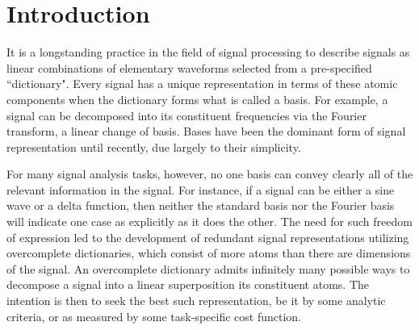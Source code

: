 \chapter{Introduction}\label{Intro}




It is a longstanding practice in the field of signal processing to describe signals as linear combinations of elementary waveforms selected from a pre-specified ``dictionary". Every signal has a unique representation in terms of these atomic components when the dictionary forms what is called a basis. For example, a signal can be decomposed into its constituent frequencies via the Fourier transform, a linear change of basis. %
Bases have been the dominant form of signal representation until recently, due largely to their simplicity. 

For many signal analysis tasks, however, no one basis can convey clearly all of the relevant information in the signal. For instance, if a signal can be either a sine wave or a delta function, then neither the standard basis nor the Fourier basis will indicate one case as explicitly as it does the other. 
The need for such freedom of expression led to the development of redundant signal representations utilizing overcomplete dictionaries, which consist of more atoms than there are dimensions of the signal. An overcomplete dictionary admits infinitely many possible ways to decompose a signal into a linear superposition its constituent atoms. The intention is then to seek the best such representation, be it by some analytic criteria, or as measured by some task-specific cost function. 

